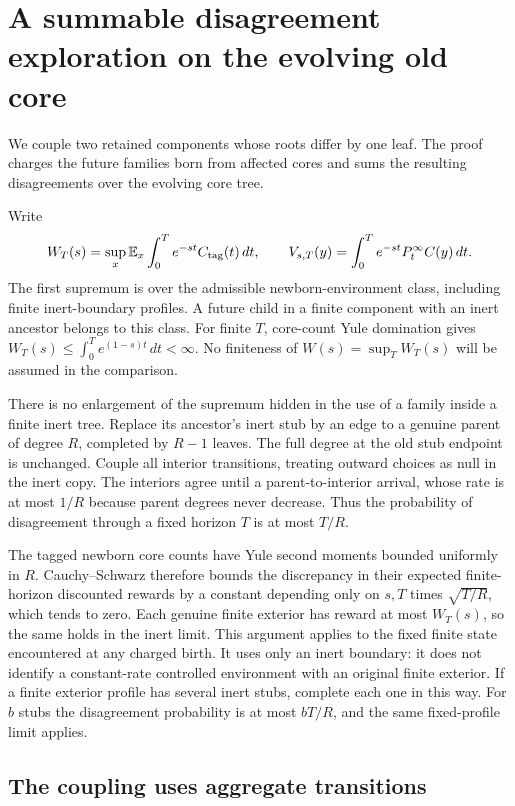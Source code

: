 \section{A summable disagreement exploration on the evolving old core}
\label{erc:section}

We couple two retained components whose roots differ by one leaf. The proof charges the future families born from affected cores and sums the resulting disagreements over the evolving core tree.

Write
\[
 W_T(s)=\sup_x\mathbb E_x\int_0^T e^{-st}C_{\rm tag}(t)\,dt,
 \qquad
 V_{s,T}(y)=\int_0^T e^{-st}P_t^\infty C(y)\,dt.
\]
The first supremum is over the admissible newborn-environment
class, including finite inert-boundary profiles.  A future child in a
finite component with an inert ancestor belongs to this class.
For finite $T$, core-count Yule domination gives
$W_T(s)\le\int_0^T e^{(1-s)t}\,dt<\infty$.
No finiteness of $W(s)=\sup_TW_T(s)$ will be assumed in the comparison.

There is no enlargement of the supremum hidden in the use of a family
inside a finite inert tree.  Replace its ancestor's inert stub by an
edge to a genuine parent of degree $R$, completed by $R-1$ leaves.
The full degree at the old stub endpoint is unchanged.  Couple all
interior transitions, treating outward choices as null in the inert
copy.  The interiors agree until a parent-to-interior arrival, whose
rate is at most $1/R$ because parent degrees never decrease.  Thus the
probability of disagreement through a fixed horizon $T$ is at most
$T/R$.

The tagged newborn core counts have Yule second moments bounded
uniformly in $R$.  Cauchy--Schwarz therefore bounds the discrepancy in
their expected finite-horizon discounted rewards by a constant
depending only on $s,T$ times $\sqrt{T/R}$, which tends to zero.
Each genuine finite exterior has reward at most $W_T(s)$, so the same
holds in the inert limit.  This argument applies to the fixed finite
state encountered at any charged birth.  It uses only an inert
boundary: it does not identify a constant-rate controlled environment
with an original finite exterior.
If a finite exterior profile has several inert stubs, complete each
one in this way.  For $b$ stubs the disagreement probability is at most
$bT/R$, and the same fixed-profile limit applies.

\subsection{The coupling uses aggregate transitions}

